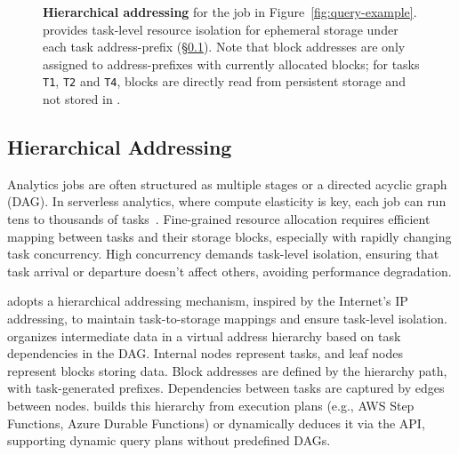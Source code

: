 \begin{figure}[t]
  \caption[Hierarchical addressing]{\textbf{Hierarchical addressing} for the job in Figure~\ref{fig:query-example}. \jiffy provides task-level resource isolation for ephemeral storage under each task address-prefix (\S\ref{ssec:hva}). Note that block addresses are only assigned to address-prefixes with currently allocated blocks; for tasks \texttt{T1}, \texttt{T2} and \texttt{T4}, blocks are directly read from persistent storage and not stored in \jiffy.}
  \label{fig:hina}
\end{figure}

\subsection{Hierarchical Addressing}
\label{ssec:hva}
Analytics jobs are often structured as multiple stages or a directed acyclic graph (DAG). In serverless analytics, where compute elasticity is key, each job can run tens to thousands of tasks~\cite{starling, locus, pocket, flint, sparkonlambda, cirrus, excamera, pywren, numpywren, gg, athena, aurora, azuresqldw, cloudburst, snowset}. Fine-grained resource allocation requires efficient mapping between tasks and their storage blocks, especially with rapidly changing task concurrency. High concurrency demands task-level isolation, ensuring that task arrival or departure doesn't affect others, avoiding performance degradation.

\jiffy adopts a hierarchical addressing mechanism, inspired by the Internet's IP addressing, to maintain task-to-storage mappings and ensure task-level isolation. \jiffy organizes intermediate data in a virtual address hierarchy based on task dependencies in the DAG. Internal nodes represent tasks, and leaf nodes represent \jiffy blocks storing data. Block addresses are defined by the hierarchy path, with task-generated prefixes. Dependencies between tasks are captured by edges between nodes. \jiffy builds this hierarchy from execution plans (e.g., AWS Step Functions, Azure Durable Functions) or dynamically deduces it via the \jiffy API, supporting dynamic query plans without predefined DAGs.

